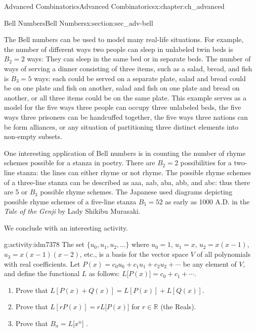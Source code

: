 \documentclass[oneside,10pt,]{book}
\numberwithin{equation}{chapter}
\def\R{\mathbb R}
\begin{document}
\begin{chapterptx}{Advanced Combinatorics}{}{Advanced Combinatorics}{}{}{x:chapter:ch_advanced}
\begin{sectionptx}{Bell Numbers}{}{Bell Numbers}{}{}{x:section:sec_adv-bell}
\par
The Bell numbers can be used to model many real-life situations. For example, the number of different ways two people can sleep in unlabeled twin beds is \(B_{2} = 2\) ways: They can sleep in the same bed or in separate beds. The number of ways of serving a dinner consisting of three items, such as a salad, bread, and fish is \(B_{3} = 5\) ways: each could be served on a separate plate, salad and bread could be on one plate and fish on another, salad and fish on one plate and bread on another, or all three items could be on the same plate. This example serves as a model for the five ways three people can occupy three unlabeled beds, the five ways three prisoners can be handcuffed together, the five ways three nations can be form alliances, or any situation of partitioning three distinct elements into non-empty subsets.%
\par
One interesting application of Bell numbers is in counting the number of rhyme schemes possible for a stanza in poetry. There are \(B_{2} = 2\) possibilities for a two-line stanza: the lines can either rhyme or not rhyme. The possible rhyme schemes of a three-line stanza can be described as aaa, aab, aba, abb, and abc: thus there are 5 or \(B_{3}\) possible rhyme schemes. The Japanese used diagrams depicting possible rhyme schemes of a five-line stanza \(B_{5} = 52\) as early as 1000 A.D. in the \emph{Tale of the Genji} by Lady Shikibu Murasaki.%
\par
We conclude with an interesting activity.%
\begin{activity}{}{g:activity:idm7378}%
The set \(\{u_{0}, u_{1}, u_{2}, \ldots \}\) where \(u_{0} = 1\), \(u_{1} = x\), \(u_{2} = x(x - 1)\), \(u_{3} = x(x - 1)(x - 2)\), etc., is a basis for the vector space \(V\) of all polynomials with real coefficients. Let \(P(x) = c_{0}u_{0} + c_{1}u_{1} + c_{2}u_{2} + \cdots\) be any element of \(V\), and define the functional \(L\) as follows: \(L\lbrack P(x)\rbrack = c_{0} + c_{1} + \cdots\).%
\par
%
\begin{enumerate}
\item{}Prove that \(L\left\lbrack P\left( x \right) + Q\left( x \right) \right\rbrack = L\left\lbrack P\left( x \right) \right\rbrack + L\left\lbrack Q\left( x \right) \right\rbrack.\)%
\item{}Prove that \(L\left\lbrack rP \left( x \right) \right\rbrack = rL\lbrack P\left( x \right)\rbrack\) for \(r \in \R\) (the Reals).%
\item{}Prove that \(B_{n} = L\lbrack x^{n}\rbrack\) .%

\end{enumerate}
\end{activity}
\end{sectionptx}
\end{chapterptx}
\end{document}
